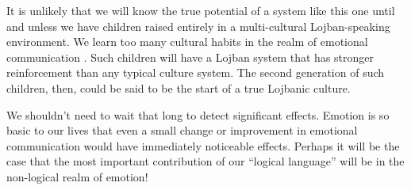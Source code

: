 It is unlikely that we will know the true potential of a
    system like this one until and unless we have children raised
    entirely in a multi-cultural Lojban-speaking environment. We
    learn too many cultural habits in the realm of emotional
    communication . Such children will have
    a Lojban system that has stronger reinforcement than any
    typical culture system. The second generation of such children,
    then, could be said to be the start of a true Lojbanic
    culture.

We shouldn't need to wait that long to detect significant
    effects. Emotion is so basic to our lives that even a small
    change or improvement in emotional communication would have
    immediately noticeable effects. Perhaps it will be the case
    that the most important contribution of our ``logical
    language'' will be in the non-logical realm of emotion!